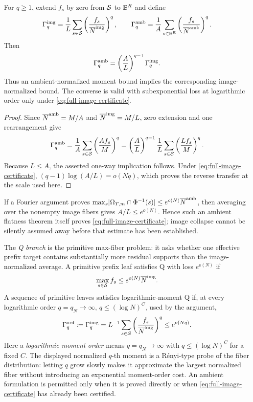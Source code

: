 \documentclass[11pt,a4paper]{amsart}
\numberwithin{equation}{section}
\theoremstyle{remark}
\begin{document}
\begin{lemma}
\label{lem:image-ambient-moment-conversion}
For \(q\ge1\), extend \(f_s\) by zero from \(\mathcal S\) to \(\mathbb B^R\) and
define
\[
 \Gamma_q^{\rm img}=\frac1L\sum_{s\in\mathcal S}
       \left(\frac{f_s}{\overline N^{\rm img}}\right)^q,
 \qquad
 \Gamma_q^{\rm amb}=\frac1A\sum_{s\in\mathbb B^R}
       \left(\frac{f_s}{\overline N^{\rm amb}}\right)^q.
\]
Then
\begin{equation}
 \Gamma_q^{\rm amb}
   =\left(\frac{A}{L}\right)^{q-1}\Gamma_q^{\rm img}.
 \label{eq:image-ambient-moment-identity}
\end{equation}
Thus an ambient-normalized moment bound implies the corresponding
image-normalized bound.  The converse is valid with subexponential loss at
logarithmic order only under \eqref{eq:full-image-certificate}.
\end{lemma}

\begin{proof}
Since \(\overline N^{\rm amb}=M/A\) and \(\overline N^{\rm img}=M/L\), zero extension
and one rearrangement give
\[
 \Gamma_q^{\rm amb}
 =\frac1A\sum_{s\in\mathcal S}\left(\frac{Af_s}{M}\right)^q
 =\left(\frac AL\right)^{q-1}
   \frac1L\sum_{s\in\mathcal S}\left(\frac{Lf_s}{M}\right)^q.
\]
Because \(L\le A\), the asserted one-way implication follows.  Under
\eqref{eq:full-image-certificate},
\((q-1)\log(A/L)=o(Nq)\), which proves the reverse transfer at the scale
used here.
\end{proof}

\begin{remark}
\label{rem:flatness-certifies-image}
If a Fourier argument proves
\(\max_s\lvert \Omega_{T,m}\cap\Phi^{-1}(s)\rvert
 \le e^{o(N)}\overline N^{\rm amb}\), then averaging over the nonempty image
fibers gives \(A/L\le e^{o(N)}\).  Hence such an ambient flatness theorem
itself proves \eqref{eq:full-image-certificate}; image collapse cannot be
silently assumed away before that estimate has been established.
\end{remark}

\begin{definition}[Primitive Q]\label{def:primitive-q}
The \emph{Q branch} is the primitive max-fiber problem: it asks whether one
effective prefix target contains substantially more residual supports than
the image-normalized average.  A primitive prefix leaf satisfies Q with
loss \(e^{o(N)}\) if
\[
        \max_{s\in\mathcal S}f_s\le e^{o(N)}\overline N^{\rm img}.
\]
A sequence of primitive leaves satisfies logarithmic-moment Q if, at every
logarithmic order \(q=q_N\to\infty\), \(q\le(\log N)^C\), used by the
argument,
\[
 \Gamma^{\rm ord}_q\coloneqq\Gamma_q^{\rm img}
 =L^{-1}\sum_{s\in\mathcal S}
       \left(\frac{f_s}{\overline N^{\rm img}}\right)^q
 \le e^{o(Nq)}.
\]
Here a \emph{logarithmic moment order} means
\(q=q_N\to\infty\) with \(q\le(\log N)^C\) for a fixed \(C\).  The
displayed normalized \(q\)-th moment is a R\'enyi-type probe of the fiber
distribution: letting \(q\) grow slowly makes it approximate the largest
normalized fiber without introducing an exponential moment-order cost.
An ambient formulation is permitted only when it is proved directly or
when \eqref{eq:full-image-certificate} has already been certified.
\end{definition}
\end{document}

